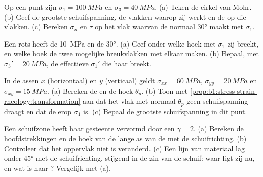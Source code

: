 \begin{exercise}[$\star$]\label{exo:b1:stress-strain-rheology:3}
Op een punt zijn $\sigma_1 = \qty{100}{MPa}$ en $\sigma_3 = \qty{40}{MPa}$. (a) Teken de cirkel van Mohr. (b) Geef de grootste schuifspanning, de vlakken waarop zij werkt en de  op die vlakken. (c) Bereken $\sigma_n$ en $\tau$ op het vlak waarvan de normaal \ang{30} maakt met $\sigma_1$.
\end{exercise}

\begin{exercise}[$\star$]\label{exo:b1:stress-strain-rheology:4}
Een rots heeft de  \qty{10}{MPa} en de  \ang{30}. (a) Geef onder welke hoek met $\sigma_1$ zij breekt, en welke hoek de twee mogelijke breukvlakken met elkaar maken. (b) Bepaal, met $\sigma_3' = \qty{20}{MPa}$, de effectieve $\sigma_1'$ die haar breekt.
\end{exercise}

\begin{exercise}[$\star\star$]\label{exo:b1:stress-strain-rheology:5}
In de assen $x$ (horizontaal) en $y$ (verticaal) geldt $\sigma_{xx} = \qty{60}{MPa}$, $\sigma_{yy} = \qty{20}{MPa}$ en $\sigma_{xy} = \qty{15}{MPa}$. (a) Bereken de  en de hoek $\theta_p$. (b) Toon met \cref{prop:b1:stress-strain-rheology:transformation} aan dat het vlak met normaal $\theta_p$ geen schuifspanning draagt en dat de  erop $\sigma_1$ is. (c) Bepaal de grootste schuifspanning in dit punt.
\end{exercise}

\begin{exercise}[$\star\star$]\label{exo:b1:stress-strain-rheology:6}
Een schuifzone heeft haar gesteente vervormd door een  $\gamma = 2$. (a) Bereken de hoofdstrekkingen en de hoek van de lange as van de  met de schuifrichting. (b) Controleer dat het oppervlak niet is veranderd. (c) Een lijn van materiaal lag onder \ang{45} met de schuifrichting, stijgend in de zin van de schuif: waar ligt zij nu, en wat is haar ? Vergelijk met (a).
\end{exercise}

